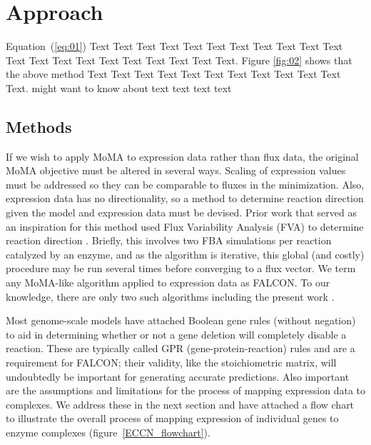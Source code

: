 \section{Approach}

Equation~(\ref{eq:01}) Text Text Text Text Text Text  Text Text Text Text Text Text Text Text Text  Text Text Text Text Text Text. Figure \ref{fig:02} shows that the above method  Text Text Text Text  Text Text Text Text Text Text  Text Text.  \citealp{Boffelli03} might want to know about  text text text text


\begin{methods}
\section{Methods}




If we wish to apply MoMA to expression data rather than flux data, the
original MoMA objective must be altered in several ways. Scaling of
expression values must be addressed so they can be comparable to
fluxes in the minimization. Also, expression data has no
directionality, so a method to determine reaction direction given the
model and expression data must be devised. Prior work that served as
an inspiration for this method used Flux Variability Analysis (FVA) to
determine reaction direction \cite{Lee2012}. Briefly, this involves
two FBA simulations per reaction catalyzed by an enzyme, and as the
algorithm is iterative, this global (and costly) procedure may be run
several times before converging to a flux vector. We term any
MoMA-like algorithm applied to expression data as FALCON. To our
knowledge, there are only two such algorithms including the present
work \cite{Lee2012}.

Most genome-scale models have attached Boolean gene rules (without
negation) to aid in determining whether or not a gene deletion will
completely disable a reaction. These are typically called GPR
(gene-protein-reaction) rules and are a requirement for FALCON; their
validity, like the stoichiometric matrix, will undoubtedly be
important for generating accurate predictions. Also important are the
assumptions and limitations for the process of mapping expression data
to complexes. We address these in the next section and have attached a
flow chart to illustrate the overall process of mapping expression of
individual genes to enzyme complexes (figure~\ref{ECCN_flowchart}).


\end{methods}
